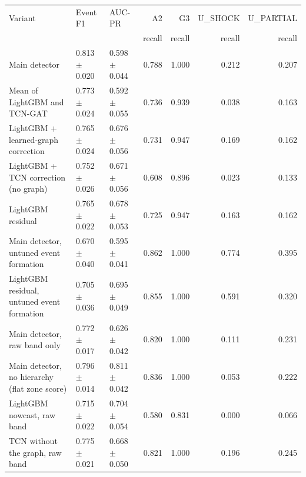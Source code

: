 \documentclass[11pt,a4paper]{article}
\makeatletter
\newenvironment{stable}{\par\addvspace{8pt}\noindent\begin{minipage}{\textwidth}\def\@captype{table}\centering}{\end{minipage}\par\addvspace{8pt}}
\makeatother
\begin{document}
\begin{stable}
\caption{Detector variants at 3\% contamination (test period, mean $\pm$ s.d. over the 10 test seeds), at the main detector's event formation unless stated; recall columns: means.}\label{tab:s-variants}
\scriptsize\setlength{\tabcolsep}{3.5pt}
\begin{tabular}{@{}>{\raggedright\arraybackslash}p{4.8cm} l l r r r r@{}}
\toprule
Variant & Event F1 & AUC-PR & A2 & G3 & U\_SHOCK & U\_PARTIAL \\
 & & & recall & recall & recall & recall \\
\midrule
Main detector & 0.813 $\pm$ 0.020 & 0.598 $\pm$ 0.044 & 0.788 & 1.000 & 0.212 & 0.207 \\
Mean of LightGBM and TCN-GAT & 0.773 $\pm$ 0.024 & 0.592 $\pm$ 0.055 & 0.736 & 0.939 & 0.038 & 0.163 \\
LightGBM + learned-graph correction & 0.765 $\pm$ 0.024 & 0.676 $\pm$ 0.056 & 0.731 & 0.947 & 0.169 & 0.162 \\
LightGBM + TCN correction (no graph) & 0.752 $\pm$ 0.026 & 0.671 $\pm$ 0.056 & 0.608 & 0.896 & 0.023 & 0.133 \\
LightGBM residual & 0.765 $\pm$ 0.022 & 0.678 $\pm$ 0.053 & 0.725 & 0.947 & 0.163 & 0.162 \\
Main detector, untuned event formation & 0.670 $\pm$ 0.040 & 0.595 $\pm$ 0.041 & 0.862 & 1.000 & 0.774 & 0.395 \\
LightGBM residual, untuned event formation & 0.705 $\pm$ 0.036 & 0.695 $\pm$ 0.049 & 0.855 & 1.000 & 0.591 & 0.320 \\
Main detector, raw band only & 0.772 $\pm$ 0.017 & 0.626 $\pm$ 0.042 & 0.820 & 1.000 & 0.111 & 0.231 \\
Main detector, no hierarchy (flat zone score) & 0.796 $\pm$ 0.014 & 0.811 $\pm$ 0.042 & 0.836 & 1.000 & 0.053 & 0.222 \\
LightGBM nowcast, raw band & 0.715 $\pm$ 0.022 & 0.704 $\pm$ 0.054 & 0.580 & 0.831 & 0.000 & 0.066 \\
TCN without the graph, raw band & 0.775 $\pm$ 0.021 & 0.668 $\pm$ 0.050 & 0.821 & 1.000 & 0.196 & 0.245 \\
\bottomrule
\end{tabular}
\end{stable}
\end{document}

